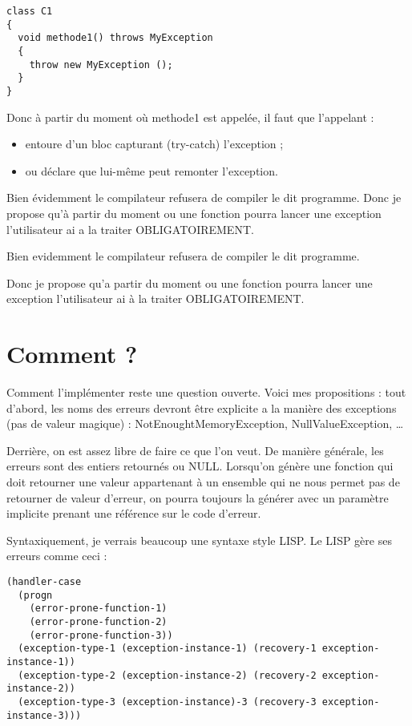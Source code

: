 \documentclass{rtxreport}
\begin{document}
\lstset{language=java}
\begin{lstlisting}
class C1
{
  void methode1() throws MyException
  {
    throw new MyException ();
  }
}
\end{lstlisting}
\lstset{language=rathaxes}

Donc à partir du moment où methode1 est appelée, il faut que l’appelant : 
\begin{itemize}
	\item entoure d’un bloc capturant (try-catch) l’exception ; 
	\item ou déclare que lui-même peut remonter l’exception. 
\end{itemize}

Bien évidemment le compilateur refusera de compiler le dit programme. Donc je
propose qu’à partir du moment ou une fonction pourra lancer une exception
l’utilisateur ai a la traiter OBLIGATOIREMENT.

Bien evidemment le compilateur refusera de compiler le dit programme.

Donc je propose qu'a partir du moment ou une fonction pourra lancer une
exception l'utilisateur ai à la traiter OBLIGATOIREMENT.

\section{Comment ?}

Comment l’implémenter reste une question ouverte. Voici mes propositions : tout
d’abord, les noms des erreurs devront être explicite a la manière des exceptions
(pas de valeur magique) : NotEnoughtMemoryException, NullValueException, \ldots

Derrière, on est assez libre de faire ce que l’on veut. De manière générale,
les erreurs sont des entiers retournés ou NULL. Lorsqu’on génère une fonction
qui doit retourner une valeur appartenant à un ensemble qui ne nous permet pas
de retourner de valeur d’erreur, on pourra toujours la générer avec un paramètre
implicite prenant une référence sur le code d’erreur.

Syntaxiquement, je verrais beaucoup une syntaxe style LISP. Le LISP gère ses
erreurs comme ceci :

\lstset{language=Lisp}
\begin{lstlisting}
(handler-case
  (progn
    (error-prone-function-1)
    (error-prone-function-2)
    (error-prone-function-3))
  (exception-type-1 (exception-instance-1) (recovery-1 exception-instance-1))
  (exception-type-2 (exception-instance-2) (recovery-2 exception-instance-2))
  (exception-type-3 (exception-instance)-3 (recovery-3 exception-instance-3)))
\end{lstlisting}
\end{document}

